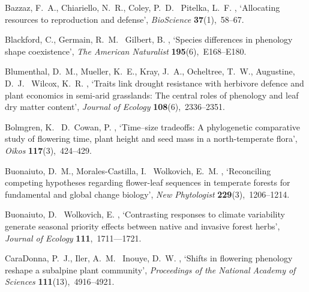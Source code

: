 \documentclass[11pt]{article}
\begin{document}
\begin{thebibliography}{xx}
Bazzaz, F.~A., Chiariello, N.~R., Coley, P.~D. \harvardand\ Pitelka, L.~F.
  \harvardyearleft 1987\harvardyearright , `Allocating resources to
  reproduction and defense', {\em BioScience} {\bf 37}(1),~58--67.

Blackford, C., Germain, R.~M. \harvardand\ Gilbert, B.  \harvardyearleft
  2020\harvardyearright , `Species differences in phenology shape coexistence',
  {\em The American Naturalist} {\bf 195}(6),~E168--E180.

Blumenthal, D.~M., Mueller, K.~E., Kray, J.~A., Ocheltree, T.~W., Augustine,
  D.~J. \harvardand\ Wilcox, K.~R.  \harvardyearright ,
  `Traits link drought resistance with herbivore defence and plant economics in
  semi-arid grasslands: The central roles of phenology and leaf dry matter
  content', {\em Journal of Ecology} {\bf 108}(6),~2336--2351.

Bolmgren, K. \harvardand\ D.~Cowan, P.  \harvardyearright
  , `Time--size tradeoffs: A phylogenetic comparative study of flowering time,
  plant height and seed mass in a north-temperate flora', {\em Oikos} {\bf
  117}(3),~424--429.

Buonaiuto, D.~M., Morales-Castilla, I. \harvardand\ Wolkovich, E.~M.
  \harvardyearleft 2021\harvardyearright , `Reconciling competing hypotheses
  regarding flower-leaf sequences in temperate forests for fundamental and
  global change biology', {\em New Phytologist} {\bf 229}(3),~1206--1214.

Buonaiuto, D. \harvardand\ Wolkovich, E.  \harvardyearright , `Contrasting responses to climate variability
  generate seasonal priority effects between native and invasive forest herbs',
  {\em Journal of Ecology} {\bf 111},~1711---1721.

CaraDonna, P.~J., Iler, A.~M. \harvardand\ Inouye, D.~W.  \harvardyearright , `Shifts in flowering phenology reshape a subalpine
  plant community', {\em Proceedings of the National Academy of Sciences} {\bf
  111}(13),~4916--4921.


\end{thebibliography}
\end{document}
